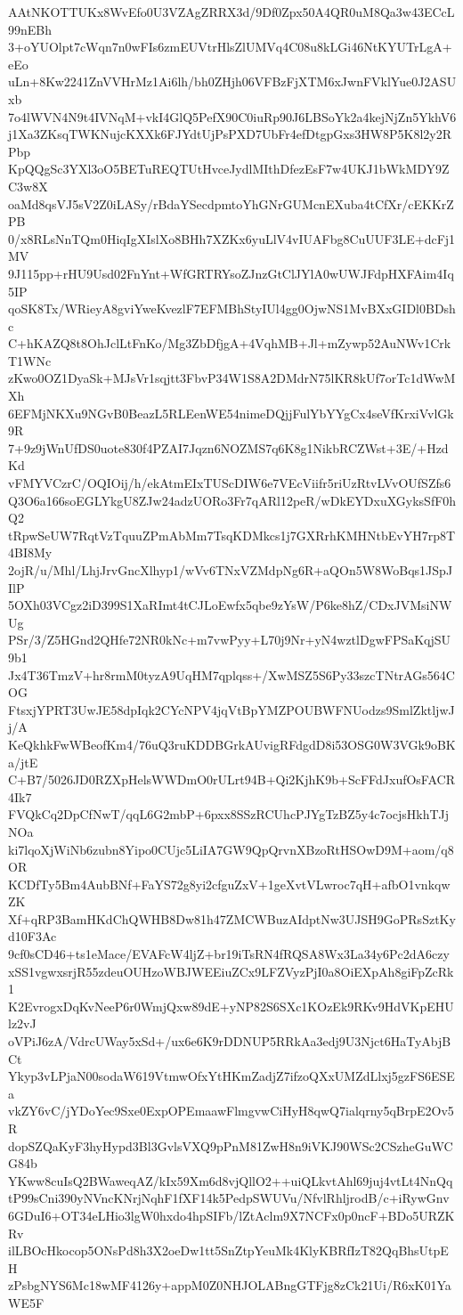 AAtNKOTTUKx8WvEfo0U3VZAgZRRX3d/9Df0Zpx50A4QR0uM8Qa3w43ECcL99nEBh
3+oYUOlpt7cWqn7n0wFIs6zmEUVtrHlsZlUMVq4C08u8kLGi46NtKYUTrLgA+eEo
uLn+8Kw2241ZnVVHrMz1Ai6lh/bh0ZHjh06VFBzFjXTM6xJwnFVklYue0J2ASUxb
7o4lWVN4N9t4IVNqM+vkI4GlQ5PefX90C0iuRp90J6LBSoYk2a4kejNjZn5YkhV6
j1Xa3ZKsqTWKNujcKXXk6FJYdtUjPsPXD7UbFr4efDtgpGxs3HW8P5K8l2y2RPbp
KpQQgSc3YXl3oO5BETuREQTUtHvceJydlMIthDfezEsF7w4UKJ1bWkMDY9ZC3w8X
oaMd8qsVJ5sV2Z0iLASy/rBdaYSecdpmtoYhGNrGUMcnEXuba4tCfXr/cEKKrZPB
0/x8RLsNnTQm0HiqIgXIslXo8BHh7XZKx6yuLlV4vIUAFbg8CuUUF3LE+dcFj1MV
9J115pp+rHU9Usd02FnYnt+WfGRTRYsoZJnzGtClJYlA0wUWJFdpHXFAim4Iq5IP
qoSK8Tx/WRieyA8gviYweKvezlF7EFMBhStyIUl4gg0OjwNS1MvBXxGIDl0BDshc
C+hKAZQ8t8OhJclLtFnKo/Mg3ZbDfjgA+4VqhMB+Jl+mZywp52AuNWv1CrkT1WNc
zKwo0OZ1DyaSk+MJsVr1sqjtt3FbvP34W1S8A2DMdrN75lKR8kUf7orTc1dWwMXh
6EFMjNKXu9NGvB0BeazL5RLEenWE54nimeDQjjFulYbYYgCx4seVfKrxiVvlGk9R
7+9z9jWnUfDS0uote830f4PZAI7Jqzn6NOZMS7q6K8g1NikbRCZWst+3E/+HzdKd
vFMYVCzrC/OQIOij/h/ekAtmEIxTUScDIW6e7VEcViifr5riUzRtvLVvOUfSZfs6
Q3O6a166soEGLYkgU8ZJw24adzUORo3Fr7qARl12peR/wDkEYDxuXGyksSfF0hQ2
tRpwSeUW7RqtVzTquuZPmAbMm7TsqKDMkcs1j7GXRrhKMHNtbEvYH7rp8T4BI8My
2ojR/u/Mhl/LhjJrvGncXlhyp1/wVv6TNxVZMdpNg6R+aQOn5W8WoBqs1JSpJIlP
5OXh03VCgz2iD399S1XaRImt4tCJLoEwfx5qbe9zYsW/P6ke8hZ/CDxJVMsiNWUg
PSr/3/Z5HGnd2QHfe72NR0kNc+m7vwPyy+L70j9Nr+yN4wztlDgwFPSaKqjSU9b1
Jx4T36TmzV+hr8rmM0tyzA9UqHM7qplqss+/XwMSZ5S6Py33szcTNtrAGs564COG
FtsxjYPRT3UwJE58dpIqk2CYcNPV4jqVtBpYMZPOUBWFNUodzs9SmlZktljwJj/A
KeQkhkFwWBeofKm4/76uQ3ruKDDBGrkAUvigRFdgdD8i53OSG0W3VGk9oBKa/jtE
C+B7/5026JD0RZXpHelsWWDmO0rULrt94B+Qi2KjhK9b+ScFFdJxufOsFACR4Ik7
FVQkCq2DpCfNwT/qqL6G2mbP+6pxx8SSzRCUhcPJYgTzBZ5y4c7ocjsHkhTJjNOa
ki7lqoXjWiNb6zubn8Yipo0CUjc5LiIA7GW9QpQrvnXBzoRtHSOwD9M+aom/q8OR
KCDfTy5Bm4AubBNf+FaYS72g8yi2cfguZxV+1geXvtVLwroc7qH+afbO1vnkqwZK
Xf+qRP3BamHKdChQWHB8Dw81h47ZMCWBuzAIdptNw3UJSH9GoPRsSztKyd10F3Ac
9cf0sCD46+ts1eMace/EVAFcW4ljZ+br19iTsRN4fRQSA8Wx3La34y6Pc2dA6czy
xSS1vgwxsrjR55zdeuOUHzoWBJWEEiuZCx9LFZVyzPjI0a8OiEXpAh8giFpZcRk1
K2EvrogxDqKvNeeP6r0WmjQxw89dE+yNP82S6SXc1KOzEk9RKv9HdVKpEHUlz2vJ
oVPiJ6zA/VdrcUWay5xSd+/ux6e6K9rDDNUP5RRkAa3edj9U3Njct6HaTyAbjBCt
Ykyp3vLPjaN00sodaW619VtmwOfxYtHKmZadjZ7ifzoQXxUMZdLlxj5gzFS6ESEa
vkZY6vC/jYDoYec9Sxe0ExpOPEmaawFlmgvwCiHyH8qwQ7ialqrny5qBrpE2Ov5R
dopSZQaKyF3hyHypd3Bl3GvlsVXQ9pPnM81ZwH8n9iVKJ90WSc2CSzheGuWCG84b
YKww8cuIsQ2BWaweqAZ/kIx59Xm6d8vjQllO2++uiQLkvtAhl69juj4vtLt4NnQq
tP99sCni390yNVncKNrjNqhF1fXF14k5PedpSWUVu/NfvlRhljrodB/c+iRywGnv
6GDuI6+OT34eLHio3lgW0hxdo4hpSIFb/lZtAclm9X7NCFx0p0ncF+BDo5URZKRv
ilLBOcHkocop5ONsPd8h3X2oeDw1tt5SnZtpYeuMk4KlyKBRfIzT82QqBhsUtpEH
zPsbgNYS6Mc18wMF4126y+appM0Z0NHJOLABngGTFjg8zCk21Ui/R6xK01YaWE5F
